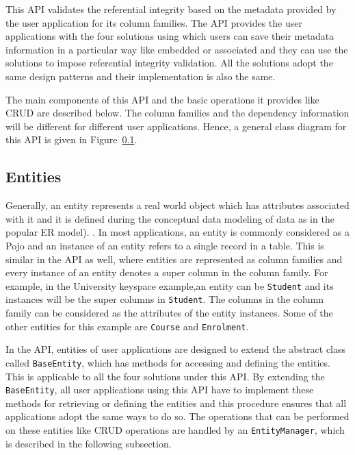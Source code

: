 This \ac{API} validates the referential integrity based on the metadata provided
by the user application for its column families.  The \ac{API} provides the user
applications with the four solutions using which users can save their metadata
information in a particular way like embedded or associated and they can use the
solutions to impose referential integrity validation.  All the solutions adopt
the same design patterns and their implementation is also the same. 


The main components of this \ac{API} and the basic operations it provides like
\ac{CRUD} are described below.  The column families and the
dependency information will be different for different user applications.  Hence,
a general class diagram for this \ac{API} is given in
Figure~\ref{}. 
\\

	\subsection{Entities} 
	Generally, an entity represents a real world object which has attributes
	associated with it and it is defined during the conceptual data modeling of
	data as in the popular \ac{ER} model). .  
	In most applications, an entity is commonly considered as a \ac{Pojo} and an
	instance of an entity refers to a single record in a table.  This is similar in
	the \ac{API} as well, where entities are  represented as column families and
	every instance of an entity  denotes a super column in the column family. 
	For example, in the University keyspace example,an entity can be 
	\texttt{Student} and its instances will be the  super columns in
	\texttt{Student}. The columns in the column family can
	be considered as the attributes of the entity instances. Some of the other
	entities for this example are \texttt{Course} and \texttt{Enrolment}. 
	
	In the \ac{API}, entities of  user applications are
	designed to extend the abstract class called \texttt{BaseEntity}, which has methods for
	accessing and defining the entities.  This is applicable to all the four
	solutions under this \ac{API}.  By extending the \texttt{BaseEntity}, all user
	applications using this \ac{API} have to implement these methods for retrieving
	or defining the entities and this procedure ensures that all applications adopt the same ways
	to do so.  The operations that can be performed on these entities like
	\ac{CRUD} operations are handled by an \texttt{EntityManager}, which is
	described in the following subsection. 
	
